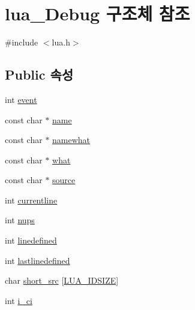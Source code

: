 \hypertarget{structlua___debug}{\section{lua\-\_\-\-Debug 구조체 참조}
\label{structlua___debug}
}


{\ttfamily \#include $<$lua.\-h$>$}

\subsection*{\-Public 속성}
\begin{DoxyCompactItemize}
\item 
int \hyperlink{structlua___debug_a6578d385d2322429a0fe87b79f1ddec0}{event}
\item 
const char $\ast$ \hyperlink{structlua___debug_a2978ab7f2ade479a003beb16d3b7a993}{name}
\item 
const char $\ast$ \hyperlink{structlua___debug_a7e8c201950ea4dd3f2c7df9e1201019a}{namewhat}
\item 
const char $\ast$ \hyperlink{structlua___debug_afbf8df5f26e9c345378a7eb402eed081}{what}
\item 
const char $\ast$ \hyperlink{structlua___debug_a422bceba8605d96bce4d19ce801a62e4}{source}
\item 
int \hyperlink{structlua___debug_a97b3ed36cdfdc6f2c694b253a3d96da6}{currentline}
\item 
int \hyperlink{structlua___debug_a983807ecf0dfa3e5e77fe7f0e2fd9d49}{nups}
\item 
int \hyperlink{structlua___debug_a97cb69b18daa46d20fb1a13eec78661b}{linedefined}
\item 
int \hyperlink{structlua___debug_a4c69b9d30e54cf9071cd2987ede128eb}{lastlinedefined}
\item 
char \hyperlink{structlua___debug_a9b953c2fa9ef95a72a9ffc423744e1a4}{short\-\_\-src} \mbox{[}\hyperlink{luaconf_8h_a49c31c00aa2852af25a2c43046a21aeb}{\-L\-U\-A\-\_\-\-I\-D\-S\-I\-Z\-E}\mbox{]}
\item 
int \hyperlink{structlua___debug_afeff0b0b87ea0fe3f5ba254d91484897}{i\-\_\-ci}
\end{DoxyCompactItemize}



